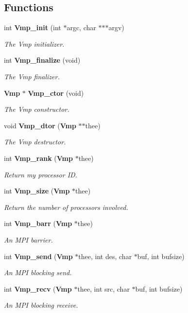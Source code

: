 \subsection*{Functions}
\begin{DoxyCompactItemize}
\item 
int {\bf Vmp\+\_\+init} (int $\ast$argc, char $\ast$$\ast$$\ast$argv)
\begin{DoxyCompactList}\small\item\em The Vmp initializer. \end{DoxyCompactList}\item 
int {\bf Vmp\+\_\+finalize} (void)
\begin{DoxyCompactList}\small\item\em The Vmp finalizer. \end{DoxyCompactList}\item 
{\bf Vmp} $\ast$ {\bf Vmp\+\_\+ctor} (void)
\begin{DoxyCompactList}\small\item\em The Vmp constructor. \end{DoxyCompactList}\item 
void {\bf Vmp\+\_\+dtor} ({\bf Vmp} $\ast$$\ast$thee)
\begin{DoxyCompactList}\small\item\em The Vmp destructor. \end{DoxyCompactList}\item 
int {\bf Vmp\+\_\+rank} ({\bf Vmp} $\ast$thee)
\begin{DoxyCompactList}\small\item\em Return my processor I\+D. \end{DoxyCompactList}\item 
int {\bf Vmp\+\_\+size} ({\bf Vmp} $\ast$thee)
\begin{DoxyCompactList}\small\item\em Return the number of processors involved. \end{DoxyCompactList}\item 
int {\bf Vmp\+\_\+barr} ({\bf Vmp} $\ast$thee)
\begin{DoxyCompactList}\small\item\em An M\+P\+I barrier. \end{DoxyCompactList}\item 
int {\bf Vmp\+\_\+send} ({\bf Vmp} $\ast$thee, int des, char $\ast$buf, int bufsize)
\begin{DoxyCompactList}\small\item\em An M\+P\+I blocking send. \end{DoxyCompactList}\item 
int {\bf Vmp\+\_\+recv} ({\bf Vmp} $\ast$thee, int src, char $\ast$buf, int bufsize)
\begin{DoxyCompactList}\small\item\em An M\+P\+I blocking receive. \end{DoxyCompactList}\end{DoxyCompactItemize}


